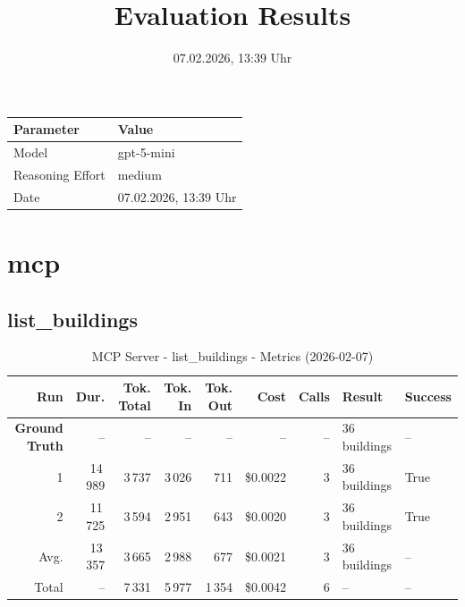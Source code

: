 \documentclass[a4paper,11pt]{article}
\title{Evaluation Results}
\date{07.02.2026, 13:39 Uhr}
\begin{document}
\maketitle

\begin{table}[H]
\centering
\begin{tabular}{l l}
\toprule
\textbf{Parameter} & \textbf{Value} \\
\midrule
Model & gpt-5-mini \\
Reasoning Effort & medium \\
Date & 07.02.2026, 13:39 Uhr \\
\bottomrule
\end{tabular}
\end{table}

\tableofcontents
\clearpage

\section{mcp}

\subsection{list\_buildings}

\begin{table}[ht]
\centering
\scriptsize
\caption{MCP Server - list\_buildings - Metrics (2026-02-07)}
\label{tab:mcp\_list\_buildings\_metrics\_2026-02-07}
\begin{tabular}{r r r r r r r p{3cm} l}
\hline
Run & Dur. & Tok. Total & Tok. In & Tok. Out & Cost & Calls & Result & Success \\
\hline
\textbf{Ground Truth} & -- & -- & -- & -- & -- & -- & 36 buildings & -- \\
1 & 14\,989 & 3\,737 & 3\,026 & 711 & \$0.0022 & 3 & 36 buildings & True \\
2 & 11\,725 & 3\,594 & 2\,951 & 643 & \$0.0020 & 3 & 36 buildings & True \\
\hline
Avg. & 13\,357 & 3\,665 & 2\,988 & 677 & \$0.0021 & 3 & 36 buildings & -- \\
Total & -- & 7\,331 & 5\,977 & 1\,354 & \$0.0042 & 6 & -- & -- \\
\hline
\end{tabular}
\end{table}

\clearpage
\end{document}
